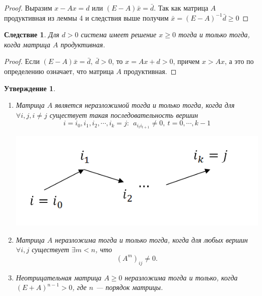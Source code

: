 \documentclass[12pt]{article}
\newtheorem*{statement}{Утверждение}
\newtheorem*{consequence}{Следствие}
\begin{document}
	\begin{proof}
		Выразим $x-Ax=d$ или $(E-A)\bar x=\bar d$. Так как матрица $A$ продуктивная из леммы 4 и следствия выше получим $\bar x=(E-A)^{-1}\bar d\geqslant 0$
	\end{proof}
	\begin{consequence}
		Для $d>0$ система имеет решение $x \geqslant 0$ тогда и только тогда, когда матрица $A$ продуктивная.
	\end{consequence}
	\begin{proof}
		Если $(E-A)\bar x=\bar d,~\bar d>0$, то $x=Ax+d>0$, причем $x>Ax$, а это по определению означает, что матрица $A$ продуктивная.
	\end{proof}
	\begin{statement}
		\ 
	\begin{enumerate}
		\item Матрица $A$ является неразложимой тогда и только тогда, когда для $\forall i, j, i\neq j$ существует такая последовательность вершин $$i=i_0, i_1, i_2, \cdots, i_k=j:~~a_{i_t i_{t+1}}\neq 0,~t=0, \cdots, k-1$$
		\begin{center}
			\includegraphics[scale=0.6]{l14_2.png}\\
		\end{center}
		\item Матрица $A$ неразложима тогда и только тогда, когда для любых вершин $\forall i, j$ существует $\exists m<n$, что $$(A^m)_{ij}\neq 0.$$
		\item Неотрицательная матрица $A\geqslant 0$ неразложима тогда и только, когда $(E+A)^{n-1}>0$, где $n$ --- порядок матрицы.
	\end{enumerate}
	\end{statement}
\end{document}
